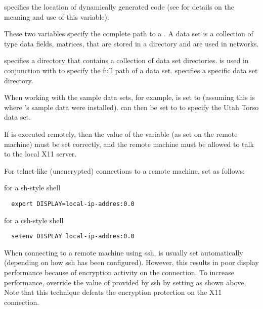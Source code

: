 \begin{description}
   specifies the location of
  dynamically generated code (see  for details on the meaning and use of
  this variable).
  
    These
  two variables specify the complete path to a \sr{} . A data set is a collection of \sr{} type data  fields,
  matrices, \etc{} that are stored in a directory and are used in
  \sr{} networks.

   specifies a directory that contains a
  collection of data set directories.   is used in
  conjunction with  to specify the full path of
  a data set.   specifies a specific data set
  directory. 

  When working with the sample \sr{} data sets, for example,
   is set to
   (assuming this is where \sr{}'s
  sample data were installed).   can then be
  set to  to specify the Utah Torso data set.
  
   If \sr{} is executed remotely, then the value of
  the  variable (as set on the remote machine) must be
  set correctly, and the remote machine must be allowed to talk to the
  local X11 server.
  
  For telnet-like (unencrypted) connections to a remote machine,
 set  as follows:

for a sh-style shell

\begin{verbatim}
  export DISPLAY=local-ip-addres:0.0
\end{verbatim}
  
for a csh-style shell

\begin{verbatim}
  setenv DISPLAY local-ip-addres:0.0
\end{verbatim}

  When connecting to a remote machine using ssh,  is
  usually set automatically (depending on how ssh has been
  configured).  However, this results in poor display performance
  because of encryption activity on the connection.  To increase
  performance, override the value of  provided
  by ssh by setting   as
  shown above.  Note that this technique defeats the encryption
  protection on the X11 connection.


\end{description}
